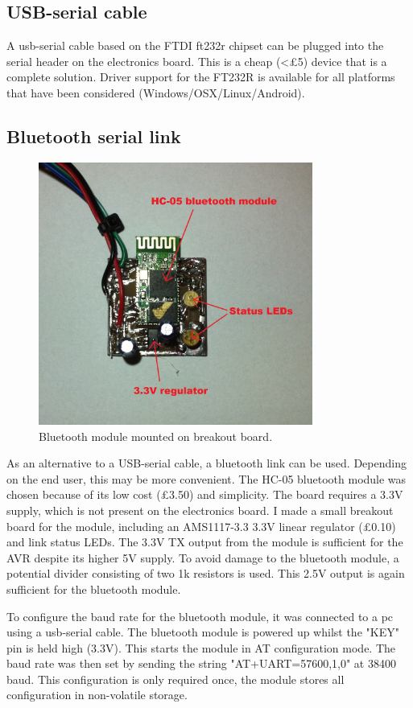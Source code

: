\documentclass[a4paper,11pt]{article}  %
\begin{document}
\subsection{USB-serial cable}
A usb-serial cable based on the FTDI ft232r chipset can be plugged into the serial header on the electronics board. This is a cheap (<£5) device that is 
a complete solution. Driver support for the FT232R is available for all platforms that have been considered (Windows/OSX/Linux/Android).

\subsection{Bluetooth serial link}
\begin{figure}[ht!]
\centering
\includegraphics[width=90mm]{resources/bluetoothmodule.jpg}
\caption{Bluetooth module mounted on breakout board.}
\label{overflow}
\end{figure}

As an alternative to a USB-serial cable, a bluetooth link can be used. Depending on the end user, this may be more convenient. The HC-05 bluetooth module was
chosen because of its low cost (£3.50) and simplicity. The board requires a 3.3V supply, which is not present on the electronics board. I made a small
breakout board for the module, including an AMS1117-3.3 3.3V linear regulator (£0.10) and link status LEDs. The 3.3V TX output from the module is sufficient
for the AVR despite its higher 5V supply. To avoid damage to the bluetooth module, a potential divider consisting of two 1k resistors is used. This 2.5V output is
again sufficient for the bluetooth module.

To configure the baud rate for the bluetooth module, it was connected to a pc using a usb-serial cable. The bluetooth module is powered up whilst the "KEY" pin is held high (3.3V).
This starts the module in AT configuration mode. The baud rate was then set by sending the string "AT+UART=57600,1,0" at 38400 baud. This configuration is only required once,
the module stores all configuration in non-volatile storage.
\end{document}
